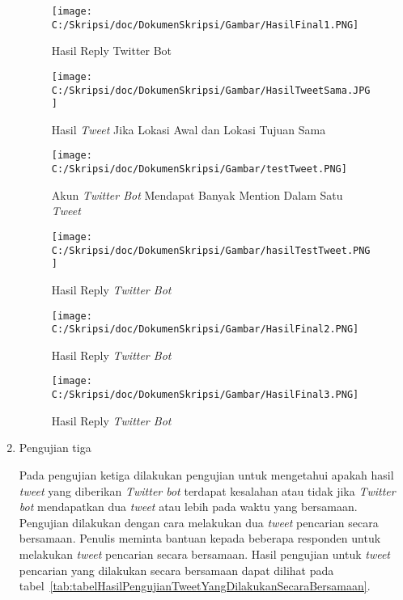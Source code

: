 \begin{enumerate}
	\newpage
	\begin{figure}
		\centering
			\texttt{[image: C:/Skripsi/doc/DokumenSkripsi/Gambar/HasilFinal1.PNG]}
		\caption{Hasil Reply Twitter Bot}
		\label{fig:HasilFinal1}
	\end{figure}
	
	\begin{figure}
		\centering
			\texttt{[image: C:/Skripsi/doc/DokumenSkripsi/Gambar/HasilTweetSama.JPG]}
		\caption{Hasil \textit{Tweet} Jika Lokasi Awal dan Lokasi Tujuan Sama}
		\label{fig:HasilTweetSama}
	\end{figure}
	
	\begin{figure}
		\centering
			\texttt{[image: C:/Skripsi/doc/DokumenSkripsi/Gambar/testTweet.PNG]}
		\caption{Akun \textit{Twitter Bot} Mendapat Banyak Mention Dalam Satu \textit{Tweet}}
		\label{fig:testTweet}
	\end{figure}
	
	\begin{figure}
		\centering
			\texttt{[image: C:/Skripsi/doc/DokumenSkripsi/Gambar/hasilTestTweet.PNG]}
		\caption{Hasil Reply \textit{Twitter Bot}}
		\label{fig:hasilTestTweet}
	\end{figure}
	
	\begin{figure}
		\centering
			\texttt{[image: C:/Skripsi/doc/DokumenSkripsi/Gambar/HasilFinal2.PNG]}
			\caption{Hasil Reply \textit{Twitter Bot}}
		\label{fig:HasilFinal2}
	\end{figure}
	
	\begin{figure}
		\centering
			\texttt{[image: C:/Skripsi/doc/DokumenSkripsi/Gambar/HasilFinal3.PNG]}
			\caption{Hasil Reply \textit{Twitter Bot}}
		\label{fig:HasilFinal3}
	\end{figure}
	
	\clearpage
	\item Pengujian tiga
	
	Pada pengujian ketiga dilakukan pengujian untuk mengetahui apakah hasil \textit{tweet} yang diberikan \textit{Twitter bot} terdapat kesalahan atau tidak jika \textit{Twitter bot} mendapatkan dua \textit{tweet} atau lebih pada waktu yang bersamaan. Pengujian dilakukan dengan cara melakukan dua \textit{tweet} pencarian secara bersamaan. Penulis meminta bantuan kepada beberapa responden untuk melakukan \textit{tweet} pencarian secara bersamaan. Hasil pengujian untuk \textit{tweet} pencarian yang dilakukan secara bersamaan dapat dilihat pada tabel~\ref{tab:tabelHasilPengujianTweetYangDilakukanSecaraBersamaan}.
	

\end{enumerate}
